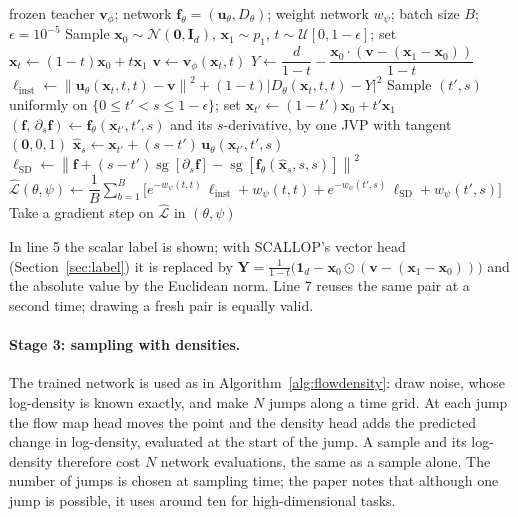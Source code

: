\documentclass[11pt,a4paper]{article}
\numberwithin{equation}{section}     %
\theoremstyle{plain}        %
\theoremstyle{definition}   %
\theoremstyle{remark}       %
\begin{document}
\begin{algorithm}[htbp]
\caption{SCALLOP: training}\label{alg:scallop}
\begin{algorithmic}[1]
\Require frozen teacher $\mathbf{v}_\phi$; network $\mathbf{f}_\theta=(\mathbf{u}_\theta,D_\theta)$; weight network $w_\psi$; batch size $B$; $\epsilon=10^{-5}$
\Repeat
{} 
\State Sample $\mathbf{x}_0\sim\mathcal{N}(\mathbf{0},\mathbf{I}_d)$, $\mathbf{x}_1\sim p_1$, $t\sim\mathcal{U}[0,1-\epsilon]$; set $\mathbf{x}_t\gets(1-t)\mathbf{x}_0+t\mathbf{x}_1$
\State $\mathbf{v}\gets\mathbf{v}_\phi(\mathbf{x}_t,t)$
\State $Y\gets\dfrac{d}{1-t}-\dfrac{\mathbf{x}_0\cdot\left(\mathbf{v}-(\mathbf{x}_1-\mathbf{x}_0)\right)}{1-t}$ 
\State $\ell_{\mathrm{inst}}\gets\left\|\mathbf{u}_\theta(\mathbf{x}_t,t,t)-\mathbf{v}\right\|^2+(1-t)\left|D_\theta(\mathbf{x}_t,t,t)-Y\right|^2$
\State Sample $(t',s)$ uniformly on $\{0\le t'<s\le1-\epsilon\}$; set $\mathbf{x}_{t'}\gets(1-t')\mathbf{x}_0+t'\mathbf{x}_1$
\State $\left(\mathbf{f},\,\partial_s\mathbf{f}\right)\gets\mathbf{f}_\theta(\mathbf{x}_{t'},t',s)$ and its $s$-derivative, by one JVP with tangent $(\mathbf{0},0,1)$
\State $\hat{\mathbf{x}}_s\gets\mathbf{x}_{t'}+(s-t')\,\mathbf{u}_\theta(\mathbf{x}_{t'},t',s)$
\State $\ell_{\mathrm{SD}}\gets\left\|\mathbf{f}+(s-t')\operatorname{sg}\left[\partial_s\mathbf{f}\right]-\operatorname{sg}\left[\mathbf{f}_\theta(\hat{\mathbf{x}}_s,s,s)\right]\right\|^2$
\EndFor
\State $\hat{\mathcal{L}}(\theta,\psi)\gets\dfrac{1}{B}\displaystyle\sum_{b=1}^{B}\Big[e^{-w_\psi(t,t)}\,\ell_{\mathrm{inst}}+w_\psi(t,t)+e^{-w_\psi(t',s)}\,\ell_{\mathrm{SD}}+w_\psi(t',s)\Big]$
\State Take a gradient step on $\hat{\mathcal{L}}$ in $(\theta,\psi)$
\end{algorithmic}
\end{algorithm}

In line 5 the scalar label is shown; with SCALLOP's vector head (Section~\ref{sec:label}) it is replaced by $\mathbf{Y}=\frac{1}{1-t}\big(\mathbf{1}_d-\mathbf{x}_0\odot(\mathbf{v}-(\mathbf{x}_1-\mathbf{x}_0))\big)$ and the absolute value by the Euclidean norm. Line 7 reuses the same pair at a second time; drawing a fresh pair is equally valid.

\paragraph{Stage 3: sampling with densities.} The trained network is used as in Algorithm~\ref{alg:flowdensity}: draw noise, whose log-density is known exactly, and make $N$ jumps along a time grid. At each jump the flow map head moves the point and the density head adds the predicted change in log-density, evaluated at the start of the jump. A sample and its log-density therefore cost $N$ network evaluations, the same as a sample alone. The number of jumps is chosen at sampling time; the paper notes that although one jump is possible, it uses around ten for high-dimensional tasks.
\end{document}
